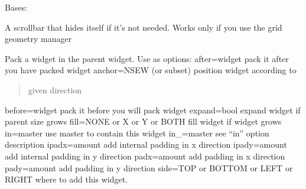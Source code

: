 \documentclass[letterpaper,10pt,spanish]{sphinxmanual}
\begin{document}
\begin{fulllineitems}
\label{\detokenize{probeDesignerUI:probeDesignerUI.AutoScrollbar}}
\pysigstartsignatures
{}
\pysigstopsignatures
\sphinxAtStartPar
Bases: 

\sphinxAtStartPar
A scrollbar that hides itself if it’s not needed.
Works only if you use the grid geometry manager

\begin{fulllineitems}
\label{\detokenize{probeDesignerUI:probeDesignerUI.AutoScrollbar.pack}}
\pysigstartsignatures
{}
\pysigstopsignatures
\sphinxAtStartPar
Pack a widget in the parent widget. Use as options:
after=widget \sphinxhyphen{} pack it after you have packed widget
anchor=NSEW (or subset) \sphinxhyphen{} position widget according to
\begin{quote}

\sphinxAtStartPar
given direction
\end{quote}

\sphinxAtStartPar
before=widget \sphinxhyphen{} pack it before you will pack widget
expand=bool \sphinxhyphen{} expand widget if parent size grows
fill=NONE or X or Y or BOTH \sphinxhyphen{} fill widget if widget grows
in=master \sphinxhyphen{} use master to contain this widget
in\_=master \sphinxhyphen{} see “in” option description
ipadx=amount \sphinxhyphen{} add internal padding in x direction
ipady=amount \sphinxhyphen{} add internal padding in y direction
padx=amount \sphinxhyphen{} add padding in x direction
pady=amount \sphinxhyphen{} add padding in y direction
side=TOP or BOTTOM or LEFT or RIGHT \sphinxhyphen{}  where to add this widget.

\end{fulllineitems}



\end{fulllineitems}
\end{document}
